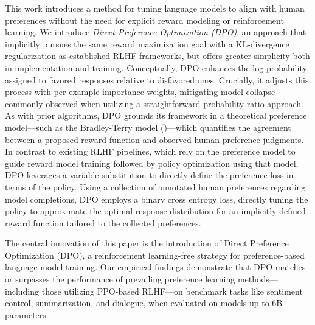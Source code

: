 This work introduces a method for tuning language models to align with human preferences without the need for explicit reward modeling or reinforcement learning. We introduce \textit{Direct Preference Optimization (DPO)}, an approach that implicitly pursues the same reward maximization goal with a KL-divergence regularization as established RLHF frameworks, but offers greater simplicity both in implementation and training. Conceptually, DPO enhances the log probability assigned to favored responses relative to disfavored ones. Crucially, it adjusts this process with per-example importance weights, mitigating model collapse commonly observed when utilizing a straightforward probability ratio approach. As with prior algorithms, DPO grounds its framework in a theoretical preference model—such as the Bradley-Terry model (\cite{bradley1952rankanalysis})—which quantifies the agreement between a proposed reward function and observed human preference judgments. In contrast to existing RLHF pipelines, which rely on the preference model to guide reward model training followed by policy optimization using that model, DPO leverages a variable substitution to directly define the preference loss in terms of the policy. Using a collection of annotated human preferences regarding model completions, DPO employs a binary cross entropy loss, directly tuning the policy to approximate the optimal response distribution for an implicitly defined reward function tailored to the collected preferences.

The central innovation of this paper is the introduction of Direct Preference Optimization (DPO), a reinforcement learning-free strategy for preference-based language model training. Our empirical findings demonstrate that DPO matches or surpasses the performance of prevailing preference learning methods—including those utilizing PPO-based RLHF—on benchmark tasks like sentiment control, summarization, and dialogue, when evaluated on models up to 6B parameters.

